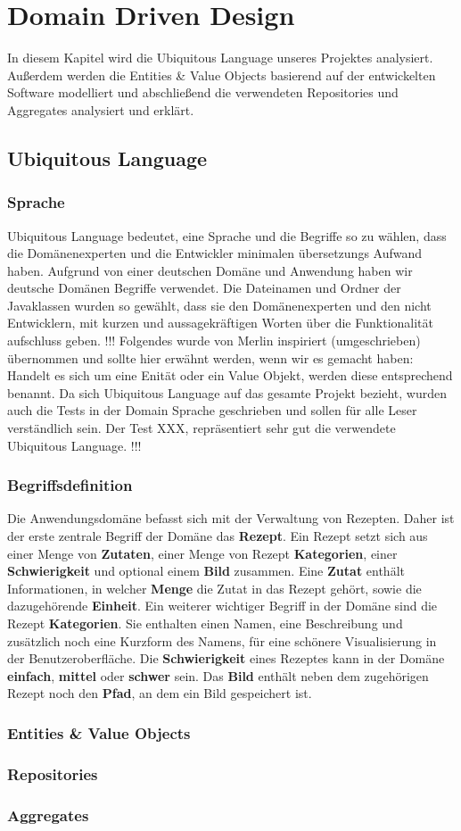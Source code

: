 \chapter{Domain Driven Design}
In diesem Kapitel wird die Ubiquitous Language unseres Projektes analysiert. Außerdem werden die Entities \& Value Objects basierend auf der entwickelten Software modelliert und abschließend die verwendeten Repositories und Aggregates analysiert und erklärt.
\section{Ubiquitous Language}
\subsection{Sprache}
Ubiquitous Language  bedeutet, eine Sprache und die Begriffe so zu wählen, dass die Domänenexperten und die Entwickler minimalen übersetzungs Aufwand haben.  Aufgrund von einer deutschen Domäne und Anwendung haben wir deutsche Domänen Begriffe verwendet.
Die Dateinamen und Ordner der Javaklassen wurden so gewählt, dass sie den Domänenexperten und den nicht Entwicklern, mit kurzen und aussagekräftigen Worten über die Funktionalität aufschluss geben. !!! Folgendes wurde von Merlin inspiriert (umgeschrieben) übernommen und sollte hier erwähnt werden, wenn wir es gemacht haben: Handelt es sich um eine Enität oder ein Value Objekt, werden diese entsprechend benannt.
Da sich Ubiquitous Language  auf das gesamte Projekt bezieht, wurden auch die Tests in der Domain Sprache geschrieben und sollen für alle Leser verständlich sein. Der Test XXX, repräsentiert sehr gut die verwendete Ubiquitous Language. !!!
\subsection{Begriffsdefinition}
Die Anwendungsdomäne befasst sich mit der Verwaltung von Rezepten. Daher ist der erste zentrale Begriff der Domäne das \textbf{Rezept}. Ein Rezept setzt sich aus einer Menge von \textbf{Zutaten}, einer Menge von Rezept \textbf{Kategorien}, einer \textbf{Schwierigkeit} und optional einem \textbf{Bild} zusammen. Eine \textbf{Zutat} enthält Informationen, in welcher \textbf{Menge} die Zutat in das Rezept gehört, sowie die dazugehörende \textbf{Einheit}. 
Ein weiterer wichtiger Begriff in der Domäne sind die Rezept \textbf{Kategorien}. Sie enthalten einen Namen, eine Beschreibung und zusätzlich noch eine Kurzform des Namens, für eine schönere Visualisierung in der Benutzeroberfläche.
Die \textbf{Schwierigkeit} eines Rezeptes kann in der Domäne \textbf{einfach}, \textbf{mittel} oder \textbf{schwer} sein. Das \textbf{Bild} enthält neben dem zugehörigen Rezept noch den \textbf{Pfad}, an dem ein Bild gespeichert ist.
\subsection{Entities \& Value Objects}
\subsection{Repositories}
\subsection{Aggregates}
